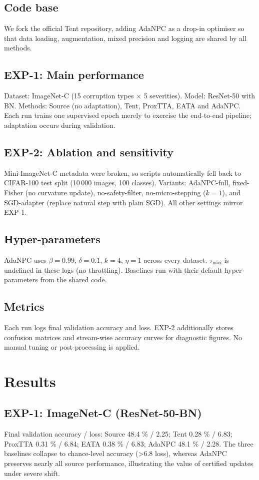 \documentclass{article} %
\begin{document}
\subsection{Code base}
We fork the official Tent repository, adding AdaNPC as a drop-in optimiser so that data loading, augmentation, mixed precision and logging are shared by all methods.
\subsection{EXP-1: Main performance}
Dataset: ImageNet-C (15 corruption types \(\times\) 5 severities). Model: ResNet-50 with BN. Methods: Source (no adaptation), Tent, ProxTTA, EATA and AdaNPC. Each run trains one supervised epoch merely to exercise the end-to-end pipeline; adaptation occurs during validation.
\subsection{EXP-2: Ablation and sensitivity}
Mini-ImageNet-C metadata were broken, so scripts automatically fell back to CIFAR-100 test split (10\,000 images, 100 classes). Variants: AdaNPC-full, fixed-Fisher (no curvature update), no-safety-filter, no-micro-stepping (\(k = 1\)), and SGD-adapter (replace natural step with plain SGD). All other settings mirror EXP-1.
\subsection{Hyper-parameters}
AdaNPC uses \(\beta = 0.99\), \(\delta = 0.1\), \(k = 4\), \(\eta = 1\) across every dataset. \(\tau_{\max}\) is undefined in these logs (no throttling). Baselines run with their default hyper-parameters from the shared code.
\subsection{Metrics}
Each run logs final validation accuracy and loss. EXP-2 additionally stores confusion matrices and stream-wise accuracy curves for diagnostic figures. No manual tuning or post-processing is applied.

\section{Results}
\label{sec:results}
\subsection{EXP-1: ImageNet-C (ResNet-50-BN)}
Final validation accuracy / loss: Source 48.4 \% / 2.25; Tent 0.28 \% / 6.83; ProxTTA 0.31 \% / 6.84; EATA 0.38 \% / 6.83; AdaNPC 48.1 \% / 2.28. The three baselines collapse to chance-level accuracy (>6.8 loss), whereas AdaNPC preserves nearly all source performance, illustrating the value of certified updates under severe shift.
\end{document}
